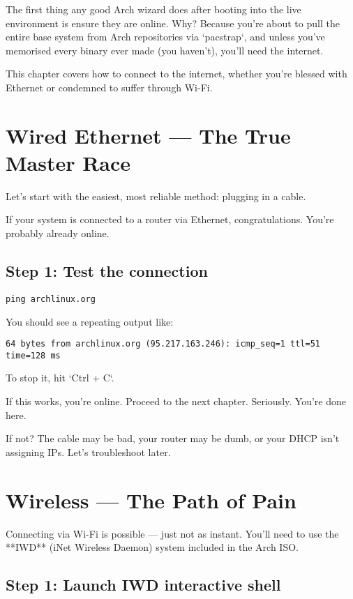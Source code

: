 \documentclass[12pt,openany]{book}
\begin{document}
The first thing any good Arch wizard does after booting into the live environment is ensure they are online. Why? Because you’re about to pull the entire base system from Arch repositories via `pacstrap`, and unless you've memorised every binary ever made (you haven't), you’ll need the internet.

This chapter covers how to connect to the internet, whether you’re blessed with Ethernet or condemned to suffer through Wi-Fi.

\section{Wired Ethernet — The True Master Race}

Let’s start with the easiest, most reliable method: plugging in a cable.

If your system is connected to a router via Ethernet, congratulations. You’re probably already online.

\subsection*{Step 1: Test the connection}

\begin{lstlisting}
ping archlinux.org
\end{lstlisting}

You should see a repeating output like:

\begin{lstlisting}
64 bytes from archlinux.org (95.217.163.246): icmp_seq=1 ttl=51 time=128 ms
\end{lstlisting}

To stop it, hit `Ctrl + C`.

If this works, you’re online. Proceed to the next chapter. Seriously. You're done here.

If not? The cable may be bad, your router may be dumb, or your DHCP isn't assigning IPs. Let’s troubleshoot later.

\section{Wireless — The Path of Pain}

Connecting via Wi-Fi is possible — just not as instant. You’ll need to use the **IWD** (iNet Wireless Daemon) system included in the Arch ISO.

\subsection*{Step 1: Launch IWD interactive shell}
\end{document}
